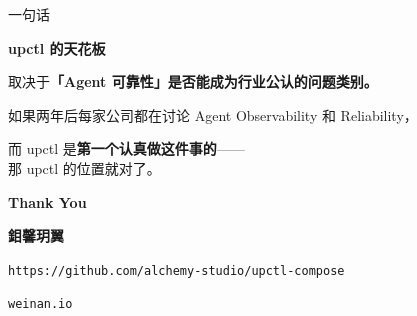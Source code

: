 \documentclass[12pt,aspectratio=169,utf8]{beamer}
\begin{document}
\begin{frame}{一句话}
  \begin{center}
    \vspace{2cm}
    {\Large\bfseries upctl 的天花板}

    \vspace{0.5cm}
    {\large 取决于\textbf{「Agent 可靠性」是否能成为行业公认的问题类别。}}

    \vspace{0.8cm}
    如果两年后每家公司都在讨论 Agent Observability 和 Reliability，

    而 upctl 是\textbf{第一个认真做这件事的}——\\[4pt]
    那 upctl 的位置就对了。
  \end{center}
\end{frame}

\begin{frame}[plain]
  \begin{center}
    \vspace{3cm}
    {\Huge \textcolor{myblue}{\textbf{Thank You}}}

    \vspace{0.8cm}
    {\large \textbf{鉬馨玥翼}~\textregistered}

    \vspace{0.3cm}
    {\large \texttt{https://github.com/alchemy-studio/upctl-compose}}

    \vspace{0.3cm}
    {\large \texttt{weinan.io}}
  \end{center}
\end{frame}
\end{document}
